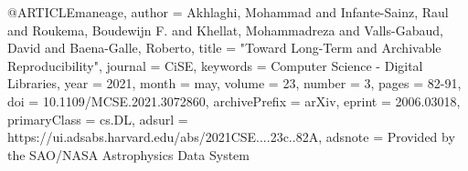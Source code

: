 %
%

@ARTICLE{maneage,
       author = {{Akhlaghi}, Mohammad and {Infante-Sainz}, Raul and
         {Roukema}, Boudewijn F. and {Khellat}, Mohammadreza and
         {Valls-Gabaud}, David and {Baena-Galle}, Roberto},
        title = "{Toward Long-Term and Archivable Reproducibility}",
      journal = {CiSE},
     keywords = {Computer Science - Digital Libraries},
         year = 2021,
        month = may,
       volume = {23},
       number = {3},
        pages = {82-91},
          doi = {10.1109/MCSE.2021.3072860},
archivePrefix = {arXiv},
       eprint = {2006.03018},
 primaryClass = {cs.DL},
       adsurl = {https://ui.adsabs.harvard.edu/abs/2021CSE....23c..82A},
      adsnote = {Provided by the SAO/NASA Astrophysics Data System}
}
